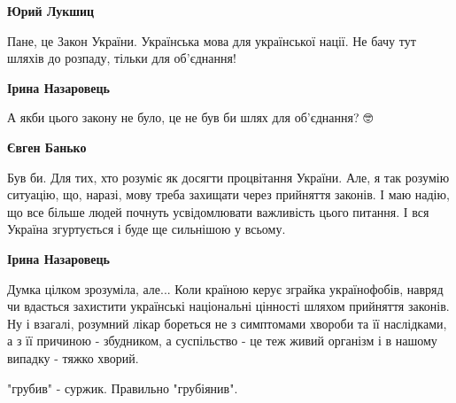 \begin{itemize}
\begin{itemize}
\textbf{Юрий Лукшиц} 

Пане, це Закон України. Українська мова для української нації. Не бачу тут
шляхів до розпаду, тільки для об'єднання!


 
\textbf{Ірина Назаровець} 

А якби цього закону не було, це не був би шлях для об'єднання? 🤓

 
\textbf{Євген Банько} 

Був би. Для тих, хто розуміє як досягти процвітання України. Але, я так розумію
ситуацію, що, наразі, мову треба захищати через прийняття законів. І маю надію,
що все більше людей почнуть усвідомлювати важливість цього питання. І вся
Україна згуртується і буде ще сильнішою у всьому.


 
\textbf{Ірина Назаровець} 

Думка цілком зрозуміла, але... Коли країною керує зграйка українофобів, навряд
чи вдасться захистити українські національні цінності шляхом прийняття законів.
Ну і взагалі, розумний лікар бореться не з симптомами хвороби та її наслідками,
а з її причиною - збудником, а суспільство - це теж живий організм і в нашому
випадку - тяжко хворий.

\end{itemize}

 
"грубив" - суржик. Правильно "грубіянив".


\end{itemize}
